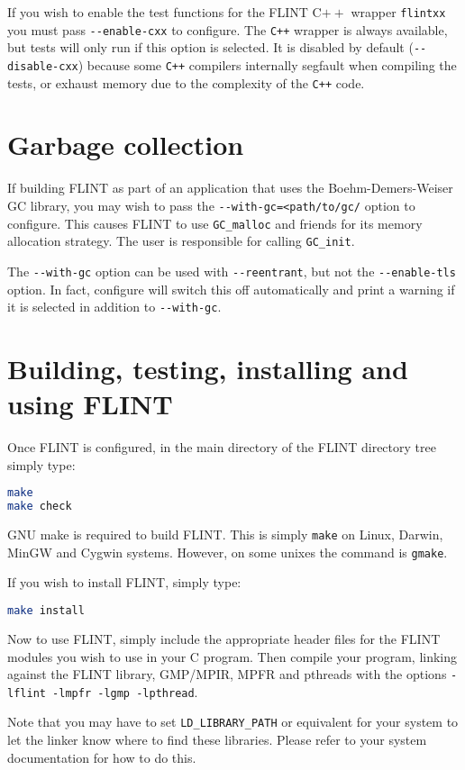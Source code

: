 \documentclass[a4paper,10pt]{book}
\newcommand{\code}{\lstinline}
\begin{document}
If you wish to enable the test functions for the FLINT C$++$ wrapper
\code{flintxx} you must pass \code{--enable-cxx} to configure. The
\code{C++} wrapper is always available, but tests will only run if
this option is selected. It is disabled by default (\code{--disable-cxx})
because some \code{C++} compilers internally segfault when compiling the
tests, or exhaust memory due to the complexity of the \code{C++} code.

\chapter{Garbage collection}

If building FLINT as part of an application that uses the
Boehm-Demers-Weiser GC library, you may wish to pass the
\code{--with-gc=<path/to/gc/} option to configure. This causes
FLINT to use \code{GC_malloc} and friends for its memory allocation
strategy. The user is responsible for calling \code{GC_init}.

The \code{--with-gc} option can be used with \code{--reentrant}, but not the
\code{--enable-tls} option. In fact, configure will switch this off
automatically and print a warning if it is selected in addition to
\code{--with-gc}.

\chapter{Building, testing, installing and using FLINT}

Once FLINT is configured, in the main directory of the FLINT directory
tree simply type:
\begin{lstlisting}[language=bash]
make
make check
\end{lstlisting}

GNU make is required to build FLINT. This is simply \code{make} on
Linux, Darwin, MinGW and Cygwin systems. However, on some unixes the
command is \code{gmake}.

If you wish to install FLINT, simply type:
\begin{lstlisting}[language=bash]
make install
\end{lstlisting}

Now to use FLINT, simply include the appropriate header files for
the FLINT modules you wish to use in your C program.  Then compile
your program, linking against the FLINT library, GMP/MPIR, MPFR and
pthreads with the options \code{-lflint -lmpfr -lgmp -lpthread}.

Note that you may have to set \code{LD_LIBRARY_PATH} or equivalent
for your system to let the linker know where to find these libraries.
Please refer to your system documentation for how to do this.
\end{document}
